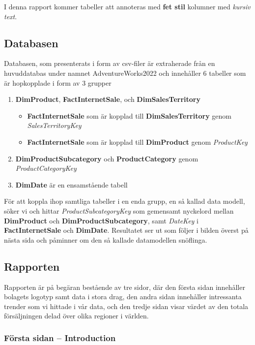 \documentclass[10pt]{article}
\begin{document}
\newpage

I denna rapport kommer tabeller att annoteras med \textbf{fet stil} kolumner med \emph{kursiv text}.

\subsection{Databasen}

Databasen, som presenterats i form av csv-filer är extraherade från en huvuddatabas under namnet AdventureWorks2022 och innehåller 6 tabeller som är hopkopplade i form av 3 grupper
\begin{enumerate}
	\item \textbf{DimProduct}, \textbf{FactInternetSale}, och \textbf{DimSalesTerritory}
		\begin{itemize}
			\item \textbf{FactInternetSale} som är kopplad till \textbf{DimSalesTerritory} genom \emph{SalesTerritoryKey}
			\item \textbf{FactInternetSale} som är kopplad till \textbf{DimProduct} genom \emph{ProductKey}
		\end{itemize}
	\item \textbf{DimProductSubcategory} och \textbf{ProductCategory} genom \emph{ProductCategoryKey}
	\item \textbf{DimDate} är en ensamstående tabell
\end{enumerate}

För att koppla ihop samtliga tabeller i en enda grupp, en så kallad data modell, söker vi och hittar \emph{ProductSubcategoryKey} som gemensamt nyckelord mellan \textbf{DimProduct} och \textbf{DimProductSubcategory}, samt \emph{DateKey} i \textbf{FactInternetSale} och \textbf{DimDate}. Resultatet ser ut som följer i bilden överst på nästa sida och påminner om den så kallade datamodellen snöflinga.

\subsection{Rapporten}

Rapporten är på begäran bestående av tre sidor, där den första sidan innehåller bolagets logotyp samt data i stora drag, den andra sidan innehåller intressanta trender som vi hittade i vår data, och den tredje sidan visar värdet av den totala försäljningen delad över olika regioner i världen.

\subsubsection{Första sidan -- Introduction}
\end{document}
